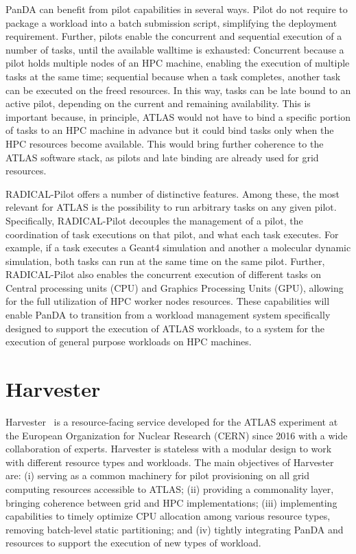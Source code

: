 \documentclass{webofc}
\begin{document}
PanDA can benefit from pilot capabilities in several ways. Pilot do not
require to package a workload into a batch submission script, simplifying the
deployment requirement. Further, pilots enable the concurrent and sequential
execution of a number of tasks, until the available walltime is exhausted:
Concurrent because a pilot holds multiple nodes of an HPC machine, enabling
the execution of multiple tasks at the same time; sequential because when a
task completes, another task can be executed on the freed resources. In this
way, tasks can be late bound to an active pilot, depending on the current and
remaining availability. This is important because, in principle, ATLAS would
not have to bind a specific portion of tasks to an HPC machine in advance but
it could bind tasks only when the HPC resources become available. This would
bring further coherence to the ATLAS software stack, as pilots and late
binding are already used for grid resources.

RADICAL-Pilot offers a number of distinctive features. Among these, the most
relevant for ATLAS is the possibility to run arbitrary tasks on any given
pilot. Specifically, RADICAL-Pilot decouples the management of a pilot, the
coordination of task executions on that pilot, and what each task executes.
For example, if a task executes a Geant4 simulation and another a molecular
dynamic simulation, both tasks can run at the same time on the same pilot.
Further, RADICAL-Pilot also enables the concurrent execution of different
tasks on Central processing units (CPU) and Graphics Processing Units (GPU),
allowing for the full utilization of HPC worker nodes resources. These
capabilities will enable PanDA to transition from a workload management
system specifically designed to support the execution of ATLAS workloads, to
a system for the execution of general purpose workloads on HPC machines.


\section{Harvester}
\label{section:harvester}

Harvester~\citep{Megino_2017} is a resource-facing service developed for the
ATLAS experiment at the European Organization for Nuclear Research (CERN)
since 2016 with a wide collaboration of experts. Harvester is stateless with
a modular design to work with different resource types and workloads. The
main objectives of Harvester are: (i) serving as a common machinery for pilot
provisioning on all grid computing resources accessible to ATLAS; (ii)
providing a commonality layer, bringing coherence between grid and HPC
implementations; (iii) implementing capabilities to timely optimize CPU
allocation among various resource types, removing batch-level static
partitioning; and (iv) tightly integrating PanDA and resources to support the
execution of new types of workload.
\end{document}

